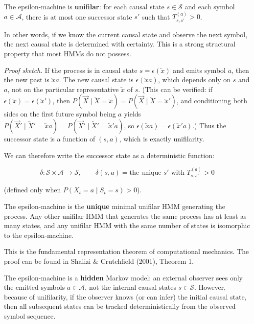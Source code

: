\begin{theorem}[Unifilarity]
The epsilon-machine is \textbf{unifilar}: for each causal state $s \in \mathcal{S}$ and each symbol $a \in \mathcal{A}$, there is at most one successor state $s'$ such that $T^{(a)}_{s,s'} > 0$.

In other words, if we know the current causal state and observe the next symbol, the next causal state is determined with certainty. This is a strong structural property that most HMMs do not possess.

\textit{Proof sketch.} If the process is in causal state $s = \epsilon(\overleftarrow{x})$ and emits symbol $a$, then the new past is $\overleftarrow{x}a$. The new causal state is $\epsilon(\overleftarrow{x}a)$, which depends only on $s$ and $a$, not on the particular representative $\overleftarrow{x}$ of $s$. (This can be verified: if $\epsilon(\overleftarrow{x}) = \epsilon(\overleftarrow{x}')$, then $P(\overrightarrow{X} \mid \overleftarrow{X} = \overleftarrow{x}) = P(\overrightarrow{X} \mid \overleftarrow{X} = \overleftarrow{x}')$, and conditioning both sides on the first future symbol being $a$ yields $P(\overrightarrow{X}' \mid \overleftarrow{X}' = \overleftarrow{x}a) = P(\overrightarrow{X}' \mid \overleftarrow{X}' = \overleftarrow{x}'a)$, so $\epsilon(\overleftarrow{x}a) = \epsilon(\overleftarrow{x}'a)$.) Thus the successor state is a function of $(s, a)$, which is exactly unifilarity. 

We can therefore write the successor state as a deterministic function:

\[\delta: \mathcal{S} \times \mathcal{A} \to \mathcal{S}, \qquad \delta(s, a) = \text{the unique } s' \text{ with } T^{(a)}_{s,s'} > 0\]

(defined only when $P(X_t = a \mid S_t = s) > 0$).

\end{theorem}


\begin{theorem}
The epsilon-machine is the \textbf{unique} minimal unifilar HMM generating the process. Any other unifilar HMM that generates the same process has at least as many states, and any unifilar HMM with the same number of states is isomorphic to the epsilon-machine.

This is the fundamental representation theorem of computational mechanics. The proof can be found in Shalizi \& Crutchfield (2001), Theorem 1.
\end{theorem}

\begin{remark}
The epsilon-machine is a \textbf{hidden} Markov model: an external observer sees only the emitted symbols $a \in \mathcal{A}$, not the internal causal states $s \in \mathcal{S}$. However, because of unifilarity, if the observer knows (or can infer) the initial causal state, then all subsequent states can be tracked deterministically from the observed symbol sequence.
\end{remark}




